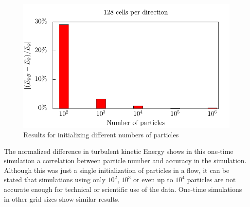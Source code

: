 \documentclass[11pt,a4paper,openany,oneside,parskip=half*]{article}
\begin{document}
\begin{figure}[h]
	\centering
  \includegraphics[width=\textwidth]{./../Simulationsergebnisse/variationPartikelAnzahl/128/kineticEnergy_numberOfParticles.pdf}
	\caption{Results for initializing different numbers of particles}
	\label{kineticEnergy_numberOfParticles}
\end{figure}
The normalized difference in turbulent kinetic Energy shows in this one-time simulation a correlation between particle number and accuracy in the simulation. Although this was just a single initialization of particles in a flow, it can be stated that simulations using only $10^2$, $10^3$ or even up to $10^4$ particles are not accurate enough for technical or scientific use of the data. One-time simulations in other grid sizes show similar results.
\pagebreak
\end{document}
